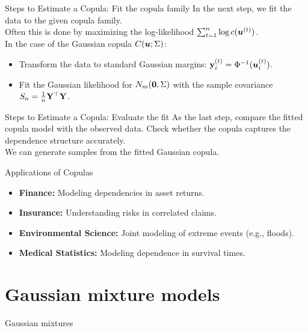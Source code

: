 \documentclass[11pt,handout,aspectratio=169]{beamer}
\begin{document}
\begin{frame}{Steps to Estimate a Copula: Fit the copula family}
In the next step, we fit the data to the given copula family. \\[3mm]

Often this is done by maximizing the log-likelihood $\sum_{t=1}^n \log c(\boldsymbol u^{(t)})$.\\[3mm]

In the case of the Gaussian copula $C(\boldsymbol u;\Sigma)$:
\begin{itemize}
	\item Transform the data to standard Gaussian margins: $\mathbf{y}^{(t)}_i=\Phi^{-1}(\boldsymbol u^{(t)}_i)$.
	\item Fit the Gaussian likelihood for $N_m(\boldsymbol 0,\Sigma)$ with the sample covariance  $S_n=\tfrac1n \mathbf{Y}^\top \mathbf{Y}$.
\end{itemize}
\end{frame}


\begin{frame}{Steps to Estimate a Copula: Evaluate the fit}
As the last step, compare the fitted copula model with the observed data. Check whether the copula captures the dependence structure accurately.\\[3mm]
We can generate samples from the fitted Gaussian copula.
\end{frame}




\begin{frame}{Applications of Copulas}
\begin{itemize}
    \item \textbf{Finance:} Modeling dependencies in asset returns.
    \item \textbf{Insurance:} Understanding risks in correlated claims.
    \item \textbf{Environmental Science:} Joint modeling of extreme events (e.g., floods).
    \item \textbf{Medical Statistics:} Modeling dependence in survival times.
\end{itemize}
\end{frame}


\section{Gaussian mixture models}

\begin{frame}{}
	\begin{center}
		{\Huge \alert{Gaussian mixtures}}
	\end{center}
\end{frame}
\end{document}
